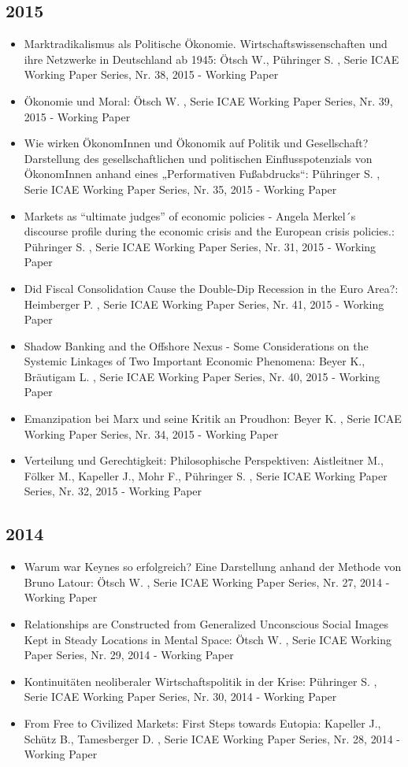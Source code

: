  \subsection{2015} 
 \begin{itemize} 
	 \item Marktradikalismus als Politische Ökonomie. Wirtschaftswissenschaften und ihre Netzwerke in Deutschland ab 1945: Ötsch W., Pühringer S. , Serie ICAE Working Paper Series, Nr. 38, 2015 - Working Paper
	 \item Ökonomie und Moral: Ötsch W. , Serie ICAE Working Paper Series, Nr. 39, 2015 - Working Paper
	 \item Wie wirken ÖkonomInnen und Ökonomik auf Politik und Gesellschaft? Darstellung des gesellschaftlichen und politischen Einflusspotenzials von ÖkonomInnen anhand eines „Performativen Fußabdrucks“: Pühringer S. , Serie ICAE Working Paper Series, Nr. 35, 2015 - Working Paper
	 \item Markets as “ultimate judges” of economic policies - Angela Merkel´s discourse profile during the economic crisis and the European crisis policies.: Pühringer S. , Serie ICAE Working Paper Series, Nr. 31, 2015 - Working Paper
	 \item Did Fiscal Consolidation Cause the Double-Dip Recession in the Euro Area?: Heimberger P. , Serie ICAE Working Paper Series, Nr. 41, 2015 - Working Paper
	 \item Shadow Banking and the Offshore Nexus - Some Considerations on the Systemic Linkages of Two Important Economic Phenomena: Beyer K., Bräutigam L. , Serie ICAE Working Paper Series, Nr. 40, 2015 - Working Paper
	 \item Emanzipation bei Marx und seine Kritik an Proudhon: Beyer K. , Serie ICAE Working Paper Series, Nr. 34, 2015 - Working Paper
	 \item Verteilung und Gerechtigkeit: Philosophische Perspektiven: Aistleitner M., Fölker M., Kapeller J., Mohr F., Pühringer S. , Serie ICAE Working Paper Series, Nr. 32, 2015 - Working Paper
\end{itemize} 
 \subsection{2014} 
 \begin{itemize} 
	 \item Warum war Keynes so erfolgreich? Eine Darstellung anhand der Methode von Bruno Latour: Ötsch W. , Serie ICAE Working Paper Series, Nr. 27, 2014 - Working Paper
	 \item Relationships are Constructed from Generalized Unconscious Social Images Kept in Steady Locations in Mental Space: Ötsch W. , Serie ICAE Working Paper Series, Nr. 29, 2014 - Working Paper
	 \item Kontinuitäten neoliberaler Wirtschaftspolitik in der Krise: Pühringer S. , Serie ICAE Working Paper Series, Nr. 30, 2014 - Working Paper
	 \item From Free to Civilized Markets: First Steps towards Eutopia: Kapeller J., Schütz B., Tamesberger D. , Serie ICAE Working Paper Series, Nr. 28, 2014 - Working Paper
\end{itemize} 
